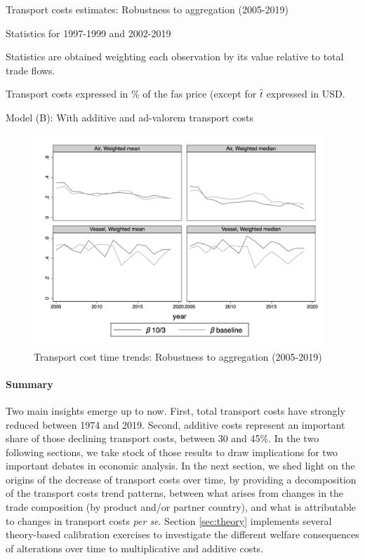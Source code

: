 \documentclass[a4paper,11pt]{article}
\begin{document}
\begin{table}[htbp]
	\centering
	\caption{Transport costs estimates: Robustness to aggregation (2005-2019)} \vspace{5mm} \label{tab:baseline10}
	
	\begin{tablenotes}
		\scriptsize
		\item Statistics for 1997-1999 and 2002-2019
		\item Statistics are obtained weighting each observation by its value relative to total trade flows.
        \item Transport costs expressed in \% of the fas price (except for $\widehat{t}$ expressed in USD.
		\item Model (B): With additive and ad-valorem transport costs
	\end{tablenotes}
\end{table}


\begin{figure}[htbp]
	\caption{Transport cost time trends: Robustness to aggregation (2005-2019)}
	\label{fig:robustness_to_agregation}
	\begin{center}
		\includegraphics[height=8cm]{scatter_chronology_baseline10_dbsamesample10_5_3.png}
	\end{center}
\end{figure}


\paragraph{Summary} Two main insights emerge up to now. First, total transport costs have strongly reduced between 1974 and 2019. Second, additive costs represent an important share of those declining transport costs, between 30 and 45\%. In the two following sections, we take stock of those results to draw implications for two important debates in economic analysis. In the next section, we shed light on the origins of the decrease of transport costs over time, by providing a decomposition of the transport costs trend patterns, between what arises from changes in the trade composition (by product and/or partner country), and what is attributable to changes in transport costs \emph{per se}. Section \ref{sec:theory} implements several theory-based calibration exercises to investigate the different welfare consequences of alterations over time to multiplicative and additive costs.
\end{document}
